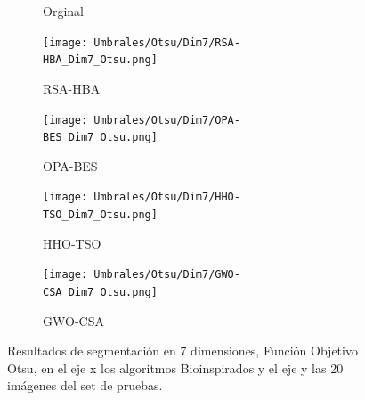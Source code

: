 \documentclass[conference]{IEEEtran}
\begin{document}
\begin{figure}[!htb]
\begin{subfigure}[b]{0.13\textwidth}
		\caption{Orginal}
		\label{fig:imgOrginal}
	\end{subfigure}
	\begin{subfigure}[b]{0.13\textwidth}
		\texttt{[image: Umbrales/Otsu/Dim7/RSA-HBA\_Dim7\_Otsu.png]}
		\caption{RSA-HBA}
		\label{fig:imagen1}
	\end{subfigure}
	\begin{subfigure}[b]{0.13\textwidth}
		\texttt{[image: Umbrales/Otsu/Dim7/OPA-BES\_Dim7\_Otsu.png]}
		\caption{OPA-BES}
		\label{fig:imagen2}
	\end{subfigure}
	\begin{subfigure}[b]{0.13\textwidth}
		\texttt{[image: Umbrales/Otsu/Dim7/HHO-TSO\_Dim7\_Otsu.png]}
		\caption{HHO-TSO}
		\label{fig:imagen2}
	\end{subfigure}
	\begin{subfigure}[b]{0.13\textwidth}
		\texttt{[image: Umbrales/Otsu/Dim7/GWO-CSA\_Dim7\_Otsu.png]}
		\caption{GWO-CSA}
		\label{fig:imagen2}
	\end{subfigure}
	
	
	\caption{Resultados de segmentación en 7 dimensiones, Función Objetivo Otsu, en el eje x los algoritmos Bioinspirados y el eje y las 20 imágenes del set de pruebas.}
	\label{fig:resultados7dim}
\end{figure}
\end{document}
